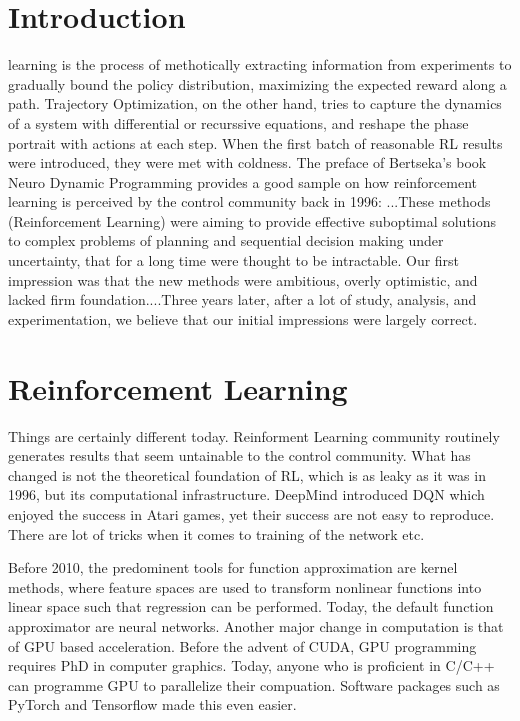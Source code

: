 \documentclass[journal]{IEEEtran}
\begin{document}
\section{Introduction}
 learning is the process of methotically extracting information from experiments to gradually bound the policy distribution, maximizing the expected reward along a path. Trajectory Optimization, on the other hand, tries to capture the dynamics of a system with differential or recurssive equations, and reshape the phase portrait with actions at each step. When the first batch of reasonable RL results were introduced, they were met with coldness. The preface of Bertseka's book Neuro Dynamic Programming provides a good sample on how reinforcement learning is perceived by the control community back in 1996: ...These methods (Reinforcement Learning) were aiming to provide effective suboptimal solutions to complex problems of planning and sequential decision making under uncertainty, that for a long time were thought to be intractable. Our first impression was that the new methods were ambitious, overly optimistic, and lacked firm foundation....Three years later, after a lot of study, analysis, and experimentation, we believe that our initial impressions were largely correct. \cite{Bertsekas1996NeuroDynamicP}

\section{Reinforcement Learning}
Things are certainly different today. Reinforment Learning community routinely generates results that seem untainable to the control community. What has changed is not the theoretical foundation of RL, which is as leaky as it was in 1996, but its computational infrastructure. DeepMind introduced DQN which enjoyed the success in Atari games, yet their success are not easy to reproduce. There are lot of tricks when it comes to training of the network etc.

Before 2010, the predominent tools for function approximation are kernel methods, where feature spaces are used to transform nonlinear functions into linear space such that regression can be performed. Today, the default function approximator are neural networks. Another major change in computation is that of GPU based acceleration. Before the advent of CUDA, GPU programming requires PhD in computer graphics. Today, anyone who is proficient in C/C++ can programme GPU to parallelize their compuation. Software packages such as PyTorch and Tensorflow made this even easier.
\end{document}
